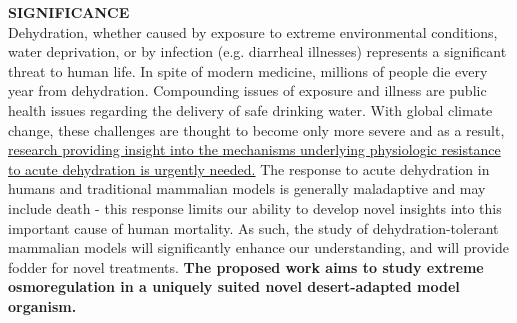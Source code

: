 %
%
%



\noindent \textbf{SIGNIFICANCE} \\

\noindent Dehydration, whether caused by exposure to extreme environmental conditions, water deprivation, or by infection (e.g. diarrheal illnesses) represents a significant threat to human life. In spite of modern medicine, millions of people die every year from dehydration. Compounding issues of exposure and illness are public health issues regarding the delivery of safe drinking water. With global climate change, these challenges are thought to become only more severe and as a result, \ul{research providing insight into the mechanisms underlying physiologic resistance to acute dehydration is urgently needed.} The response to acute dehydration in humans and traditional mammalian models is generally maladaptive and may include death - this response limits our ability to develop novel insights into this important cause of human mortality. As such, the study of dehydration-tolerant mammalian models will significantly enhance our understanding, and will provide fodder for novel treatments. \textbf{The proposed work aims to study extreme osmoregulation in a uniquely suited novel desert-adapted model organism.} \\

